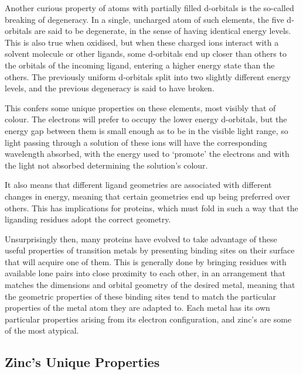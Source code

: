 Another curious property of atoms with partially filled d-orbitals is the so-called breaking of degeneracy. In a single, uncharged atom of such elements, the five d-orbitals are said to be degenerate, in the sense of having identical energy levels. This is also true when oxidised, but when these charged ions interact with a solvent molecule or other ligands, some d-orbitals end up closer than others to the orbitals of the incoming ligand, entering a higher energy state than the others. The previously uniform d-orbitals split into two slightly different energy levels, and the previous degeneracy is said to have broken.

This confers some unique properties on these elements, most visibly that of colour. The electrons will prefer to occupy the lower energy d-orbitals, but the energy gap between them is small enough as to be in the visible light range, so light passing through a solution of these ions will have the corresponding wavelength absorbed, with the energy used to `promote' the electrons and with the light not absorbed determining the solution's colour.

It also means that different ligand geometries are associated with different changes in energy, meaning that certain geometries end up being preferred over others. This has implications for proteins, which must fold in such a way that the liganding residues adopt the correct geometry.

Unsurprisingly then, many proteins have evolved to take advantage of these useful properties of transition metals by presenting binding sites on their surface that will acquire one of them. This is generally done by bringing residues with available lone pairs into close proximity to each other, in an arrangement that matches the dimensions and orbital geometry of the desired metal, meaning that the geometric properties of these binding sites tend to match the particular properties of the metal atom they are adapted to. Each metal has its own particular properties arising from its electron configuration, and zinc's are some of the most atypical.

\subsection{Zinc's Unique Properties}

